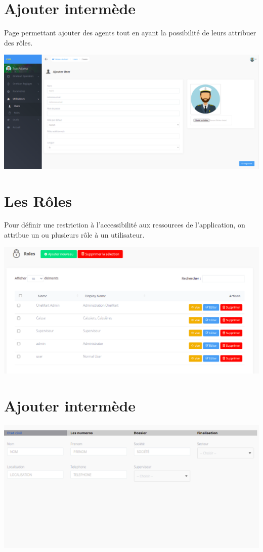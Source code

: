 	\section{Ajouter intermède}
		Page permettant ajouter des agents tout en ayant la possibilité de leurs attribuer des rôles.
		\begin{center}
			\includegraphics[scale=0.4]{chap_3/ajouter_agent.png}
			\label{ajouter_agents}
		\end{center}
	\section{Les Rôles}
		Pour définir une restriction à l'accessibilité aux ressources de l'application, on attribue un ou plusieurs rôle à un utilisateur.
		\begin{center}
			\includegraphics[scale=0.4]{chap_3/roles.png}
			\label{les_roles}
		\end{center}
	\section{Ajouter intermède}
		\begin{center}
			\includegraphics[scale=0.4]{chap_3/ajouter_intermede.png}
			\label{ajouter_intermede}
		\end{center}
